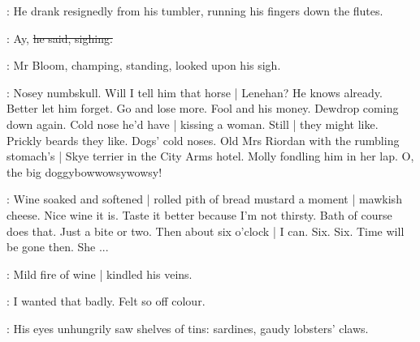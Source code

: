 :
He drank resignedly from his tumbler,
running his fingers down the flutes.

\nosey:
Ay,
\sout{he said, sighing.}

:
Mr Bloom,
champing, standing,
looked upon his sigh.

\BloomInt:
Nosey numbskull.
Will I tell him that horse |
Lenehan?
He knows already.
Better let him forget.
Go and lose more.
Fool and his money.
Dewdrop coming down again.
Cold nose he'd have |
kissing a woman.
Still |
they might like.
Prickly beards they like.
Dogs' cold noses.
Old Mrs Riordan with the rumbling stomach's |
Skye terrier in the City Arms hotel.
Molly fondling him in her lap.
O, the big doggybowwowsywowsy!

\BloomInt:
Wine soaked and softened |
rolled pith of bread
mustard a moment |
mawkish cheese.
Nice wine it is.
Taste it better because I'm not thirsty.
Bath of course does that.
Just a bite or two.
Then about six o'clock |
I can.
Six.
Six.
Time will be gone then.
She ...

:
Mild fire of wine |
kindled his veins.

\BloomInt:
I wanted that badly.
Felt so off colour.

:
His eyes unhungrily saw shelves of tins:
sardines, gaudy lobsters' claws.

